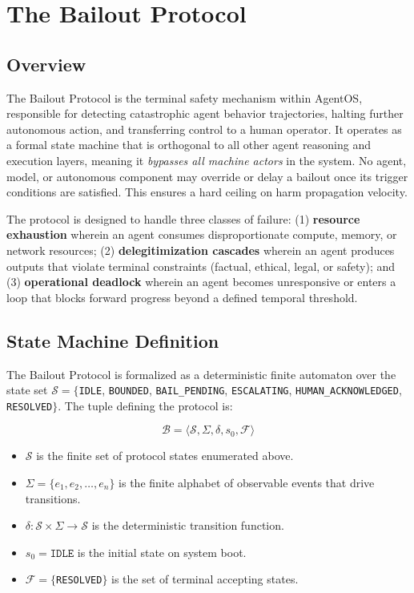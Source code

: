 \section{The Bailout Protocol}

\subsection{Overview}

The Bailout Protocol is the terminal safety mechanism within AgentOS, responsible for detecting catastrophic agent behavior trajectories, halting further autonomous action, and transferring control to a human operator. It operates as a formal state machine that is orthogonal to all other agent reasoning and execution layers, meaning it \emph{bypasses all machine actors} in the system. No agent, model, or autonomous component may override or delay a bailout once its trigger conditions are satisfied. This ensures a hard ceiling on harm propagation velocity.

The protocol is designed to handle three classes of failure: (1) \textbf{resource exhaustion} wherein an agent consumes disproportionate compute, memory, or network resources; (2) \textbf{delegitimization cascades} wherein an agent produces outputs that violate terminal constraints (factual, ethical, legal, or safety); and (3) \textbf{operational deadlock} wherein an agent becomes unresponsive or enters a loop that blocks forward progress beyond a defined temporal threshold.

\subsection{State Machine Definition}

The Bailout Protocol is formalized as a deterministic finite automaton over the state set $\mathcal{S} = \{$\texttt{IDLE}, \texttt{BOUNDED}, \texttt{BAIL\_PENDING}, \texttt{ESCALATING}, \texttt{HUMAN\_ACKNOWLEDGED}, \texttt{RESOLVED}$\}$. The tuple defining the protocol is:

\[
\mathcal{B} = \langle \mathcal{S}, \Sigma, \delta, s_0, \mathcal{F} \rangle
\]

\begin{itemize}
    \item $\mathcal{S}$ is the finite set of protocol states enumerated above.
    \item $\Sigma = \{e_1, e_2, \ldots, e_n\}$ is the finite alphabet of observable events that drive transitions.
    \item $\delta: \mathcal{S} \times \Sigma \to \mathcal{S}$ is the deterministic transition function.
    \item $s_0 = \texttt{IDLE}$ is the initial state on system boot.
    \item $\mathcal{F} = \{$\texttt{RESOLVED}$\}$ is the set of terminal accepting states.
\end{itemize}

